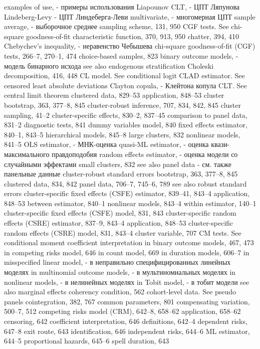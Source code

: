 examples of use, - примеры использования 
Liapounov CLT, - ЦПТ Ляпунова 
Lindeberg-Levy - ЦПТ Линдеберга-Леви 
multivariate, - многомерная ЦПТ
sample average, - выборочное среднее
sampling scheme, 131, 950
CGF tests. See chi-square goodness-of-fit characteristic function, 370, 913, 950
chatter, 394, 410
Chebychev’s inequality, - неравенство Чебышева
chi-square goodness-of-fit (CGF) tests, 266–7, 270–1,
474
choice-based samples, 823
binary outcome models, - модель бинарного исхода
see also endogenous stratification Choleski decomposition, 416, 448
CL model. See conditional logit
CLAD estimator. See censored least absolute
deviations
Clayton copula, - Клейтона копула
CLT. See central limit theorem clustered data, 829–53
application, 848–53
cluster bootstrap, 363, 377–8, 845 cluster-robust inference, 707, 834, 842,
845
cluster sampling, 41–2
cluster-specific effects, 830–2, 837–45 comparison to panel data, 831–2 diagnostic tests, 841
dummy variables model, 840
fixed effects estimator, 840–1, 843–5 hierarchical models, 845–8
large clusters, 832
nonlinear models, 841–5
OLS estimator, - МНК-оценка
quasi-ML estimator, - оценка квази-максимального правдоподобия
random effects estimator, - оценка модели со случайными эффектами
small clusters, 832
see also panel data - см. также панельные данные
cluster-robust standard errors bootstrap, 363, 377–8, 845 clustered data, 834, 842
panel data, 706–7, 745–6, 789 see also robust standard errors
cluster-specific fixed effects (CSFE) estimator, 839–41, 843–4
application, 848–53 between estimator, 840–1 nonlinear models, 843–4 within estimator, 140–1
cluster-specific fixed effects (CSFE) model, 831, 843 cluster-specific random effects (CSRE) estimator,
837–9, 843–4 application, 848–53
cluster-specific random effects (CSRE) model, 831, 843–4
cluster variable, 707
CM tests. See conditional moment coefficient interpretation
in binary outcome models, 467, 473 
in competing risks model, 646
in count model, 669
in duration models, 606–7
in misspecified linear model, - в неправильно специфицированных линейных моделях
in multinomial outcome models, - в мультиномиальных моделях
in nonlinear models, - в нелинейных моделях
in Tobit model, - в тобит модели
see also marginal effects
coherency condition, 562
cohort-level data. See pseudo panels cointegration, 382, 767
common parameters, 801
compensating variation, 500–7, 512 competing risks model (CRM), 642–8, 658–62
application, 658–62 censoring, 642
coefficient interpretation, 646 definitions, 642–4
dependent risks, 647–8
exit route, 643 identification, 646 independent risks, 644–6 ML estimator, 644–5 proportional hazards, 645–6 spell duration, 643

